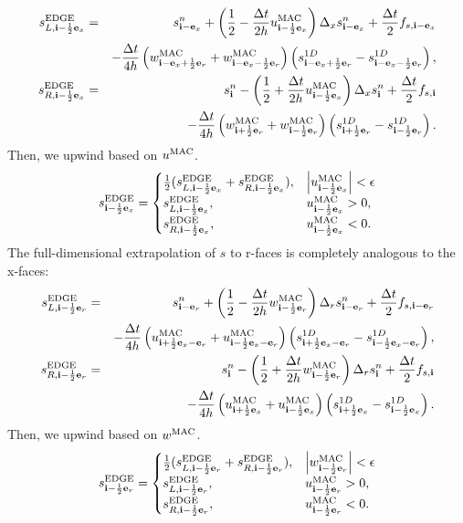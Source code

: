 \documentclass[11pt]{article}
\def\half  {\frac{1}{2}}
\def\dt    {\Delta t}
\def\edge  {\rm EDGE}
\def\mac   {\rm MAC}
\def\eb    {{\bf e}}
\def\ib    {{\bf i}}
\begin{document}
\begin{eqnarray}
s_{L,\ib-\half\eb_x}^{\edge} &=& s_{\ib-\eb_x}^n + \left(\half - \frac{\dt}{2h}u_{\ib-\half\eb_x}^{\mac}\right)\Delta_x s_{\ib-\eb_x}^n + \frac{\dt}{2}f_{s,\ib-\eb_x} \nonumber \\
&& - \frac{\dt}{4h}\left(w_{\ib-\eb_x+\half\eb_r}^{\mac}+w_{\ib-\eb_x-\half\eb_r}^{\mac}\right)\left(s_{\ib-\eb_x+\half\eb_r}^{1D} - s_{\ib-\eb_x-\half\eb_r}^{1D}\right), \\
s_{R,\ib-\half\eb_x}^{\edge} &=& s_{\ib}^n - \left(\half + \frac{\dt}{2h}u_{\ib-\half\eb_x}^{\mac}\right)\Delta_x s_{\ib}^n + \frac{\dt}{2}f_{s,\ib} \nonumber \\
&& - \frac{\dt}{4h}\left(w_{\ib+\half\eb_r}^{\mac}+w_{\ib-\half\eb_r}^{\mac}\right)\left(s_{\ib+\half\eb_r}^{1D} - s_{\ib-\half\eb_r}^{1D}\right).
\end{eqnarray}
Then, we upwind based on $u^{\mac}$.
\begin{equation}
s_{\ib-\half\eb_x}^{\edge} =
\begin{cases}
\half(s_{L,\ib-\half\eb_x}^{\edge} + s_{R,\ib-\half\eb_x}^{\edge}), & \left|u^{\mac}_{\ib-\half\eb_x}\right| < \epsilon \\
s_{L,\ib-\half\eb_x}^{\edge}, & u^{\mac}_{\ib-\half\eb_x} > 0, \\
s_{R,\ib-\half\eb_x}^{\edge}, & u^{\mac}_{\ib-\half\eb_x} < 0.
\end{cases}
\end{equation}
The full-dimensional extrapolation of $s$ to r-faces is completely analogous to the x-faces:
\begin{eqnarray}
s_{L,\ib-\half\eb_r}^{\edge} &=& s_{\ib-\eb_r}^n + \left(\half - \frac{\dt}{2h}w_{\ib-\half\eb_r}^{\mac}\right)\Delta_r s_{\ib-\eb_r}^n + \frac{\dt}{2}f_{s,\ib-\eb_r} \nonumber \\
&& - \frac{\dt}{4h}\left(u_{\ib+\half\eb_x-\eb_r}^{\mac}+u_{\ib-\half\eb_x-\eb_r}^{\mac}\right)\left(s_{\ib+\half\eb_x-\eb_r}^{1D} - s_{\ib-\half\eb_x-\eb_r}^{1D}\right),  \\
s_{R,\ib-\half\eb_r}^{\edge} &=& s_{\ib}^n - \left(\half + \frac{\dt}{2h}w_{\ib-\half\eb_r}^{\mac}\right)\Delta_r s_{\ib}^n + \frac{\dt}{2}f_{s,\ib} \nonumber \\
&& - \frac{\dt}{4h}\left(u_{\ib+\half\eb_x}^{\mac}+u_{\ib-\half\eb_x}^{\mac}\right)\left(s_{\ib+\half\eb_x}^{1D} - s_{\ib-\half\eb_x}^{1D}\right). 
\end{eqnarray}
Then, we upwind based on $w^{\mac}$.
\begin{equation}
s_{\ib-\half\eb_r}^{\edge} =
\begin{cases}
\half(s_{L,\ib-\half\eb_r}^{\edge} + s_{R,\ib-\half\eb_r}^{\edge}), & \left|w^{\mac}_{\ib-\half\eb_r}\right| < \epsilon \\
s_{L,\ib-\half\eb_r}^{\edge}, & u^{\mac}_{\ib-\half\eb_r} > 0, \\
s_{R,\ib-\half\eb_r}^{\edge}, & u^{\mac}_{\ib-\half\eb_r} < 0.
\end{cases}
\end{equation}
\end{document}
